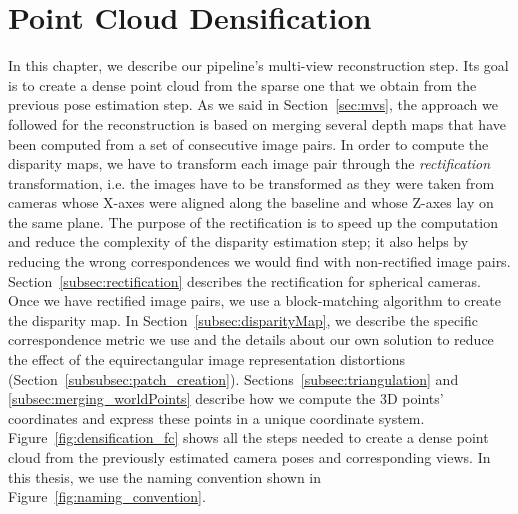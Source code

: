 \section{Point Cloud Densification}
\label{sec:pipeline_densification}
In this chapter, we describe our pipeline's multi-view reconstruction step.
Its goal is to create a dense point cloud from the sparse one that we obtain
from the previous pose estimation step.
As we said in Section~\ref{sec:mvs}, the approach we followed for the
reconstruction is based on merging several depth maps that have been computed
from a set of consecutive image pairs.
In order to compute the disparity maps, we have to transform each image pair
through the \emph{rectification} transformation, i.e. the images have to be
transformed as they were taken from cameras whose X-axes were aligned along the
baseline and whose Z-axes lay on the same plane.
The purpose of the rectification is to speed up the computation and reduce the 
complexity of the disparity estimation step; it also helps by
reducing the wrong correspondences we would find with
non-rectified image pairs. Section~\ref{subsec:rectification} describes the
rectification for spherical cameras.
Once we have rectified image pairs, we use a block-matching algorithm to create
the disparity map. In Section~\ref{subsec:disparityMap}, we describe
the specific correspondence metric we use and the details about our own
solution to reduce the effect of the equirectangular image representation distortions
(Section~\ref{subsubsec:patch_creation}).
Sections~\ref{subsec:triangulation} and \ref{subsec:merging_worldPoints}
describe how we compute the 3D points' coordinates and express these points in
a unique coordinate system.
Figure~\ref{fig:densification_fc} shows all the steps needed to
create a dense point cloud from the previously estimated camera poses and
corresponding views.
In this thesis, we use the naming convention shown in
Figure~\ref{fig:naming_convention}.

